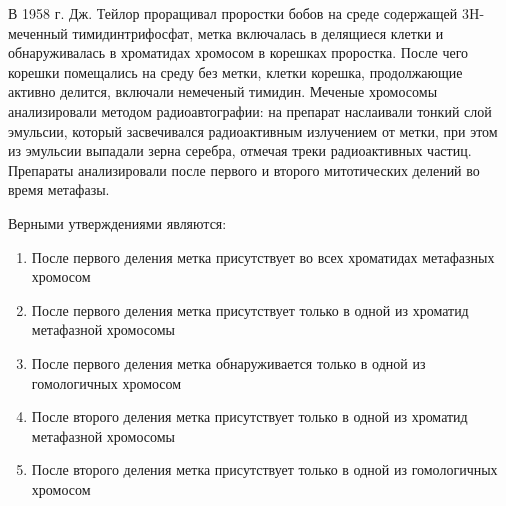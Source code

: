 
В 1958 г. Дж. Тейлор проращивал проростки бобов на среде содержащей 3H-меченный тимидинтрифосфат, метка включалась в делящиеся клетки и обнаруживалась в хроматидах хромосом в корешках проростка. После чего корешки помещались на среду без метки, клетки корешка, продолжающие активно делится, включали немеченый тимидин. Меченые хромосомы анализировали методом радиоавтографии: на препарат наслаивали тонкий слой эмульсии, который засвечивался радиоактивным излучением от метки, при этом из эмульсии выпадали зерна серебра, отмечая треки радиоактивных частиц. Препараты анализировали после первого и второго митотических делений во время метафазы.

Верными утверждениями являются:

\begin{enumerate}
    \item После первого деления метка присутствует во всех хроматидах метафазных хромосом
    \item После первого деления метка присутствует только в одной из хроматид метафазной хромосомы 
    \item После первого деления метка обнаруживается только в одной из гомологичных хромосом
    \item После второго деления метка присутствует только в одной из хроматид метафазной хромосомы
    \item После второго деления метка присутствует только в одной из гомологичных хромосом
\end{enumerate}




